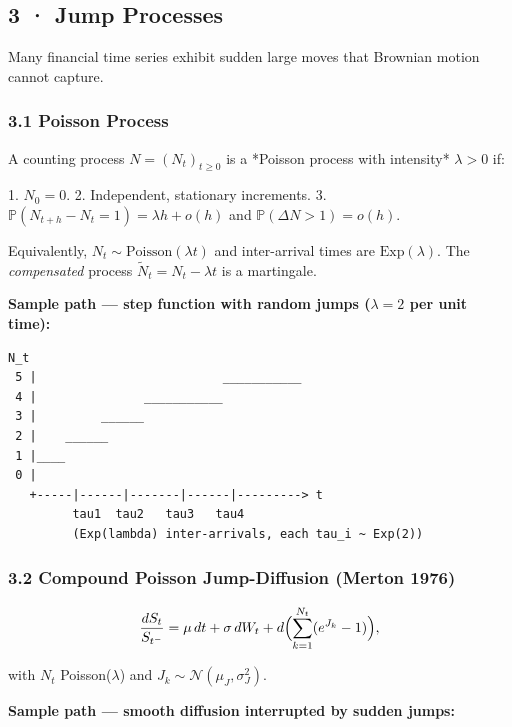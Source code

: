 \documentclass[11pt,a4paper]{article}
\begin{document}
\subsection{3 · Jump Processes}\label{jump-processes}

Many financial time series exhibit sudden large moves that Brownian motion cannot capture.

\subsubsection{3.1 Poisson Process}\label{poisson-process}

\begin{tcolorbox}[colback=defbg!60,colframe=optblue,fonttitle=\bfseries\sffamily,title={\textsf{\textbf{Definition}} — Definition — Poisson Process},breakable]
A counting process $N = (N_t)_{t\ge 0}$ is a *Poisson process with
intensity* $\lambda > 0$ if:

1. $N_0 = 0$.
2. Independent, stationary increments.
3. $\mathbb{P}(N_{t+h}-N_t=1) = \lambda h + o(h)$ and $\mathbb{P}(\Delta N > 1) = o(h)$.
\end{tcolorbox}

Equivalently, \(N_t \sim \text{Poisson}(\lambda t)\) and inter-arrival times are \(\text{Exp}(\lambda)\). The \emph{compensated} process \(\tilde N_t = N_t - \lambda t\) is a martingale.

\textbf{Sample path --- step function with random jumps (\(\lambda=2\) per unit time):}

\begin{verbatim}
N_t
 5 |                          ___________
 4 |               ___________
 3 |         ______
 2 |    ______
 1 |____
 0 |
   +-----|------|-------|------|---------> t
         tau1  tau2   tau3   tau4
         (Exp(lambda) inter-arrivals, each tau_i ~ Exp(2))
\end{verbatim}

\subsubsection{3.2 Compound Poisson Jump-Diffusion (Merton 1976)}\label{compound-poisson-jump-diffusion-merton-1976}

\[\frac{dS_t}{S_{t^-}} = \mu\,dt + \sigma\,dW_t + d\Bigl(\sum_{k=1}^{N_t}(e^{J_k}-1)\Bigr),\]

with \(N_t\) Poisson(\(\lambda\)) and \(J_k \sim \mathcal{N}(\mu_J, \sigma_J^2)\).

\textbf{Sample path --- smooth diffusion interrupted by sudden jumps:}
\end{document}
